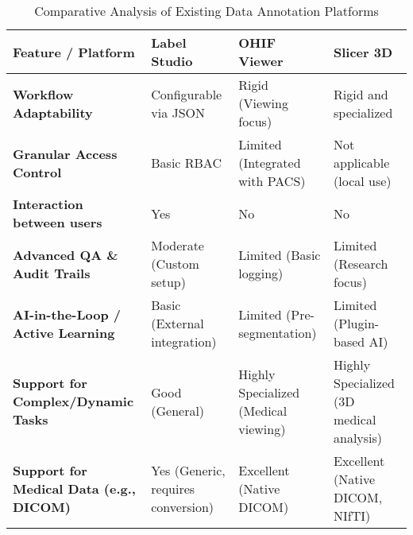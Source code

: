 \begin{table}[htbp]
    \centering
    \caption{Comparative Analysis of Existing Data Annotation Platforms}
    \label{tab:platform_limitations}
    \renewcommand{\arraystretch}{1.4}
    \begin{tabularx}{\textwidth}{|>{\raggedright\arraybackslash}X
                                    |>{\raggedright\arraybackslash}X
                                    |>{\raggedright\arraybackslash}X
                                    |>{\raggedright\arraybackslash}X|}
        \hline
        \textbf{Feature / Platform}
            & \textbf{Label Studio}
            & \textbf{OHIF Viewer}
            & \textbf{Slicer 3D} \\
        \hline
        \textbf{Workflow Adaptability}
            & Configurable via JSON
            & Rigid (Viewing focus)
            & Rigid and specialized \\
        \hline
        \textbf{Granular Access Control}
            & Basic RBAC
            & Limited (Integrated with PACS)
            & Not applicable (local use) \\
        \hline
        \textbf{Interaction between users}
            & Yes
            & No
            & No \\
        \hline
        \textbf{Advanced QA \& Audit Trails}
            & Moderate (Custom setup)
            & Limited (Basic logging)
            & Limited (Research focus) \\
        \hline
        \textbf{AI-in-the-Loop / Active Learning}
            & Basic (External integration)
            & Limited (Pre-segmentation)
            & Limited (Plugin-based AI) \\
        \hline
        \textbf{Support for Complex/Dynamic Tasks}
            & Good (General)
            & Highly Specialized (Medical viewing)
            & Highly Specialized (3D medical analysis) \\
        \hline
        \textbf{Support for Medical Data (e.g., DICOM)}
            & Yes (Generic, requires conversion)
            & Excellent (Native DICOM)
            & Excellent (Native DICOM, NIfTI) \\
        \hline
    \end{tabularx}
\end{table}

